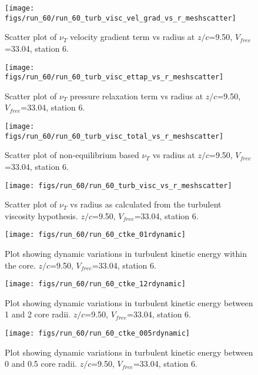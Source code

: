 \begin{figure}[H]
\centering
\texttt{[image: figs/run\_60/run\_60\_turb\_visc\_vel\_grad\_vs\_r\_meshscatter]}
\caption{Scatter plot of $\nu_T$ velocity gradient term vs radius at $z/c$=9.50, $V_{free}$=33.04, station 6.}
\end{figure}


\begin{figure}[H]
\centering
\texttt{[image: figs/run\_60/run\_60\_turb\_visc\_ettap\_vs\_r\_meshscatter]}
\caption{Scatter plot of $\nu_T$ pressure relaxation term vs radius at $z/c$=9.50, $V_{free}$=33.04, station 6.}
\end{figure}


\begin{figure}[H]
\centering
\texttt{[image: figs/run\_60/run\_60\_turb\_visc\_total\_vs\_r\_meshscatter]}
\caption{Scatter plot of non-equilibrium based $\nu_T$ vs radius at $z/c$=9.50, $V_{free}$=33.04, station 6.}
\end{figure}


\begin{figure}[H]
\centering
\texttt{[image: figs/run\_60/run\_60\_turb\_visc\_vs\_r\_meshscatter]}
\caption{Scatter plot of $\nu_T$ vs radius as calculated from the turbulent viscosity hypothesis. $z/c$=9.50, $V_{free}$=33.04, station 6.}
\end{figure}


\begin{figure}[H]
\centering
\texttt{[image: figs/run\_60/run\_60\_ctke\_01rdynamic]}
\caption{Plot showing dynamic variations in turbulent kinetic energy within the core. $z/c$=9.50, $V_{free}$=33.04, station 6.}
\end{figure}


\begin{figure}[H]
\centering
\texttt{[image: figs/run\_60/run\_60\_ctke\_12rdynamic]}
\caption{Plot showing dynamic variations in turbulent kinetic energy between 1 and 2 core radii. $z/c$=9.50, $V_{free}$=33.04, station 6.}
\end{figure}


\begin{figure}[H]
\centering
\texttt{[image: figs/run\_60/run\_60\_ctke\_005rdynamic]}
\caption{Plot showing dynamic variations in turbulent kinetic energy between 0 and 0.5 core radii. $z/c$=9.50, $V_{free}$=33.04, station 6.}
\end{figure}


